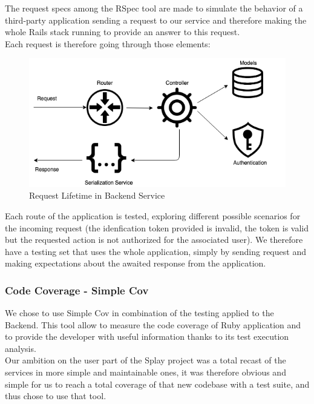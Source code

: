 \documentclass{eplmastersthesis}
\begin{document}
          The request specs among the RSpec tool are made to simulate
          the behavior of a third-party application sending a request to
          our service and therefore making the whole Rails stack running
          to provide an answer to this request.\\
          Each request is therefore going through those elements:\\

          \begin{figure}[H]
            \centering
            \includegraphics[scale=0.6]{figures/request_test.png}
            \caption{\label{request_test} Request Lifetime in Backend Service}
          \end{figure}

          Each route of the application is tested, exploring different possible
          scenarios for the incoming request (the idenfication token provided
          is invalid, the token is valid but the requested action is not
          authorized for the associated user). We therefore have a testing set
          that uses the whole application, simply by sending request and
          making expectations about the awaited response from the application.

        \subsubsection{Code Coverage - Simple Cov}

          We chose to use Simple Cov in combination of the testing applied to
          the Backend. This tool allow to measure the code coverage of Ruby
          application and to provide the developer with useful information
          thanks to its test execution analysis.\\

          Our ambition on the user part of the Splay project was a total recast of
          the services in more simple and maintainable ones, it was therefore
          obvious and simple for us to reach a total coverage of that new codebase
          with a test suite, and thus chose to use that tool.\\
\end{document}
